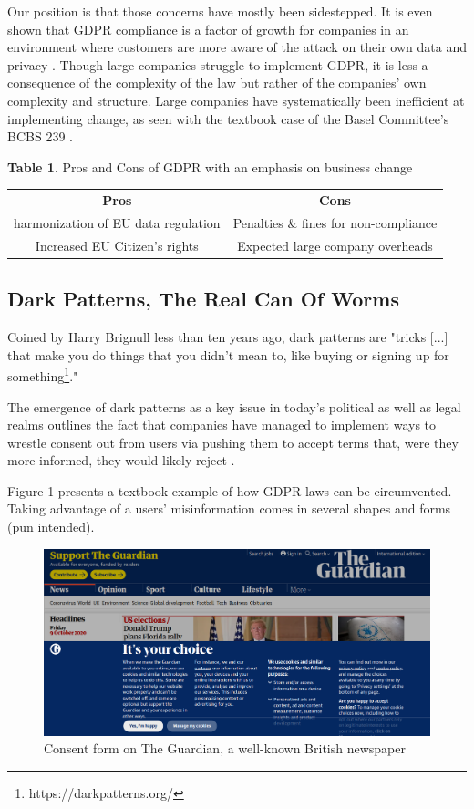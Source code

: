 \documentclass[runningheads]{llncs}
\begin{document}
Our position is that those concerns have mostly been sidestepped. It is even shown that GDPR compliance is a factor of growth for companies in an environment where customers are more aware of the attack on their own data and privacy \cite{ref5}. Though large companies struggle to implement GDPR, it is less a consequence of the complexity of the law but rather of the companies' own complexity and structure. Large companies have systematically been inefficient at implementing change, as seen with the textbook case of the Basel Committee's BCBS 239 \cite{ref6}.

\begin{center}
\textbf{Table 1}. Pros and Cons of GDPR with an emphasis on business change\newline

\begin{tabular}{ c | c }
 \textbf{Pros} & \textbf{Cons} \\ 
 harmonization of EU data regulation & Penalties \& fines for non-compliance\\ 
 Increased EU Citizen's rights & Expected large company overheads
\end{tabular}
\end{center}

\subsection{Dark Patterns, The Real Can Of Worms}
Coined by Harry Brignull \cite{ref7} less than ten years ago, dark patterns are "tricks [...] that make you do things that you didn't mean to, like buying or signing up for something\footnote{https://darkpatterns.org/}."

The emergence of dark patterns as a key issue in today's political as well as legal realms outlines the fact that companies have managed to implement ways to wrestle consent out from users via pushing them to accept terms that, were they more informed, they would likely reject \cite{ref8}. 

Figure 1 presents a textbook example of how GDPR laws can be circumvented. Taking advantage of a users' misinformation comes in several shapes and forms (pun intended). 

\begin{figure}
\includegraphics[width=\textwidth]{consent_form_guardian.png}
\caption{Consent form on The Guardian, a well-known British newspaper} \label{Figure 1}
\end{figure}
\end{document}
